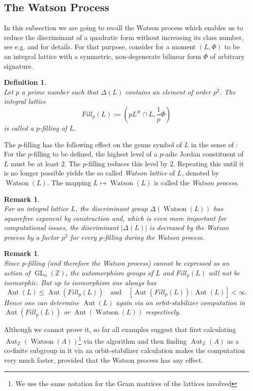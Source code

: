 \documentclass[10pt, preprint]{elsarticle}
\newtheorem{definition}[theorem]{Definition}
\newtheorem{remark}[theorem]{Remark}
\theoremstyle{definition}
\theoremstyle{definition}
\newcommand{\Z}{\mathbb{Z}}
\newcommand{\Aut}{\operatorname{Aut}}
\newcommand{\GL}{\operatorname{GL}}
\newcommand{\Watson}{\operatorname{Watson}}
\begin{document}
\subsection{The Watson Process}\label{subWatson}
In this subsection we are going to recall the Watson process which enables us to reduce the discriminant of a quadratic form without increasing its class number, see e.g. \cite{Watson} and \cite{Lorch} for details. For that purpose, consider for a moment $(L,\Phi)$ to be an integral lattice with a symmetric, non-degenerate bilinear form $\Phi$ of arbitrary signature.
\begin{definition}\mbox{}\\
Let $p$ a prime number such that $\Delta(L)$ contains an element of order $p^2$. The integral lattice
\[Fill_p(L):=(pL^\#\cap L, \frac{1}{p}\Phi)\]
is called a $p$-\emph{filling} of $L$.
\end{definition}
The $p$-filling has the following effect on the genus symbol of $L$ in the sense of \cite[Chapter 15]{CS}: For the $p$-filling to be defined, the highest level of a $p$-adic Jordan constituent of $L$ must be at least $2$. The $p$-filling reduces this level by $2$. Repeating this until it is no longer possible yields the so called \emph{Watson lattice} of $L$, denoted by $\Watson(L)$. The mapping $L\mapsto \Watson(L)$ is called the \emph{Watson process}.
\begin{remark}\mbox{}\\
For an integral lattice $L$, the discriminant group $\Delta(\Watson(L))$ has squarefree exponent by construction and, which is even more important for computational issues, the discriminant $\vert\Delta(L)\vert$ is decreased by the Watson process by a factor $p^2$ for every $p$-filling during the Watson process.
\end{remark}
\begin{remark}\mbox{}\\
Since $p$-filling (and therefore the Watson process) cannot be expressed as an action of $\GL_n(\Z)$, the automorphism groups of $L$ and $Fill_p(L)$ will not be isomorphic. But up to isomorphism one always has
\[\Aut(L)\leq\Aut(Fill_p(L))\quad\text{and}\quad [\Aut(Fill_p(L)):\Aut(L)]<\infty.\]
Hence one can determine $\Aut(L)$ again via an orbit-stabilizer computation in $\Aut(Fill_p(L))$ or $\Aut(\Watson(L))$ respectively.
\end{remark}
Although we cannot prove it, so far all examples suggest that first calculating $\Aut_\Z(\Watson(A))$\footnote{We use the same notation for the Gram matrices of the lattices involved} via the algorithm and then finding $\Aut_\Z(A)$ as a co-finite subgroup in it via an orbit-stabilizer calculation makes the computation very much faster, provided that the Watson process has any effect.
\end{document}
